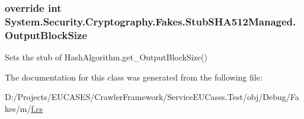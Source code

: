 \hypertarget{class_system_1_1_security_1_1_cryptography_1_1_fakes_1_1_stub_s_h_a512_managed_a7bb3660bef84214ccafa438dda37fa30}{
\subsubsection[{Output\-Block\-Size}]{\setlength{\rightskip}{0pt plus 5cm}override int System.\-Security.\-Cryptography.\-Fakes.\-Stub\-S\-H\-A512\-Managed.\-Output\-Block\-Size\hspace{0.3cm}{\ttfamily [get]}}}\label{class_system_1_1_security_1_1_cryptography_1_1_fakes_1_1_stub_s_h_a512_managed_a7bb3660bef84214ccafa438dda37fa30}


Sets the stub of Hash\-Algorithm.\-get\-\_\-\-Output\-Block\-Size()



The documentation for this class was generated from the following file\-:\begin{DoxyCompactItemize}
\item 
D\-:/\-Projects/\-E\-U\-C\-A\-S\-E\-S/\-Crawler\-Framework/\-Service\-E\-U\-Cases.\-Test/obj/\-Debug/\-Fakes/m/\hyperlink{m_2f_8cs}{f.\-cs}\end{DoxyCompactItemize}
